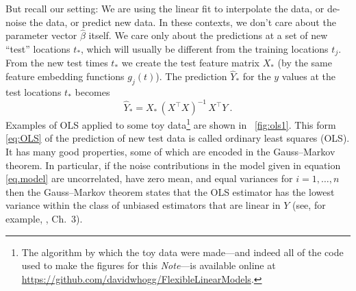 \documentclass[12pt,letterpaper]{article}
\newcommand{\documentname}{\textsl{Note}}
\begin{document}
But recall our setting:
We are using the linear fit to interpolate the data, or de-noise the data, or predict new data.
In these contexts, we don't care about the parameter vector $\hat{\beta}$ itself.
We care only about the predictions at a set of new ``test'' locations $t_\ast$, which will usually be different from the training locations $t_j$.
From the new test times $t_\ast$ we create the test feature matrix $X_\ast$ (by the same feature embedding functions $g_j(t)$).
The prediction $\hat{Y}_\ast$ for the $y$ values at the test locations $t_\ast$ becomes
\begin{equation}\label{eq:OLS}
    \hat{Y}_\ast = X_\ast\,(X^\top X)^{-1}\,X^\top Y
    ~.
\end{equation}
Examples of OLS applied to some toy data\footnote{The algorithm by which the toy data were made---and indeed all of the code used to make the figures for this \documentname---is available online at \url{https://github.com/davidwhogg/FlexibleLinearModels}.} are shown in \figurename~\ref{fig:ols1}.
This form \eqref{eq:OLS} of the prediction of new test data is called ordinary least squares (OLS). It has many good properties, some of which are encoded in the Gauss--Markov theorem.
In particular, if the noise contributions in the model given in equation \eqref{eq.model} are uncorrelated, have zero mean, and equal variances for $i=1,\ldots, n$ then the Gauss--Markov theorem states that the OLS estimator has the lowest variance within the class of unbiased estimators that are linear in $Y$ (see, for example, \citealt{esl}, Ch.~3).
\end{document}
